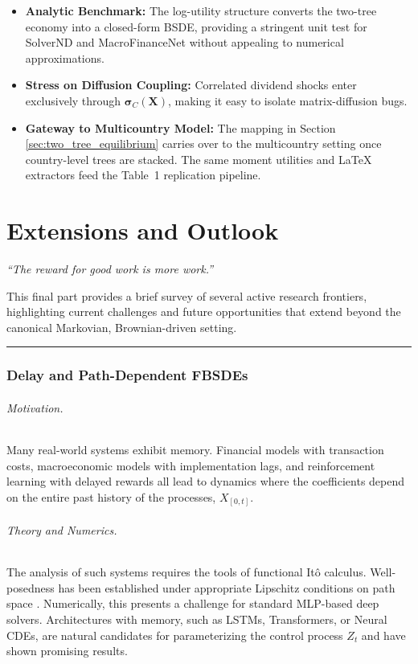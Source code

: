 \documentclass[11pt,letterpaper,oneside]{article}
\theoremstyle{plain}
\theoremstyle{definition}
\theoremstyle{remark}
\begin{document}
\begin{itemize}[leftmargin=1.2em]
  \item \textbf{Analytic Benchmark:} The log-utility structure converts the two-tree economy into a closed-form BSDE, providing a stringent unit test for SolverND and MacroFinanceNet without appealing to numerical approximations.
  \item \textbf{Stress on Diffusion Coupling:} Correlated dividend shocks enter exclusively through $\bm{\sigma}_C(\bm{X})$, making it easy to isolate matrix-diffusion bugs.
  \item \textbf{Gateway to Multicountry Model:} The mapping in Section \ref{sec:two_tree_equilibrium} carries over to the multicountry setting once country-level trees are stacked. The same moment utilities and LaTeX extractors feed the Table~1 replication pipeline.
\end{itemize}
\part{Extensions and Outlook}
\label{part:extensions}

\begin{center}
\textit{“The reward for good work is more work.”}
\end{center}

This final part provides a brief survey of several active research frontiers, highlighting current challenges and future opportunities that extend beyond the canonical Markovian, Brownian-driven setting.

\bigskip\hrule\bigskip

\section{Delay and Path-Dependent FBSDEs}
\label{sec:path_dependence}

\paragraph{Motivation.} Many real-world systems exhibit memory. Financial models with transaction costs, macroeconomic models with implementation lags, and reinforcement learning with delayed rewards all lead to dynamics where the coefficients depend on the entire past history of the processes, \(X_{[0,t]}\).

\paragraph{Theory and Numerics.} The analysis of such systems requires the tools of functional Itô calculus. Well-posedness has been established under appropriate Lipschitz conditions on path space \cite{ContFournie2013}. Numerically, this presents a challenge for standard MLP-based deep solvers. Architectures with memory, such as LSTMs, Transformers, or Neural CDEs, are natural candidates for parameterizing the control process \(Z_t\) and have shown promising results.
\end{document}

